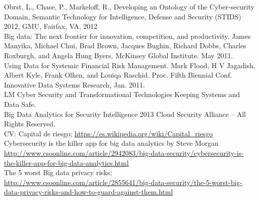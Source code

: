 \documentclass[journal]{IEEEtran}
\begin{document}
\begin{thebibliography}{1}

 Obrst, L., Chase, P., Markeloff, R., Developing an Ontology of the Cyber-security Domain, Semantic Technology for Intelligence, Defense and Security (STIDS) 2012, GMU, Fairfax, VA, 2012\\
 Big data: The next frontier for innovation, competition, and productivity. James Manyika, Michael Chui, Brad Brown, Jacques Bughin, Richard Dobbs, Charles Roxburgh, and Angela Hung Byers. McKinsey Global Institute. May 2011.\\
 Using Data for Systemic Financial Risk Management. Mark Flood, H V Jagadish, Albert Kyle, Frank Olken, and Louiqa Raschid. Proc. Fifth Biennial Conf. Innovative Data Systems Research, Jan. 2011.\\
 LM Cyber Security and Transformational Technologies Keeping Systems and Data Safe.\\
 Big Data Analytics for Security Intelligence 2013 Cloud Security Alliance – All Rights Reserved.\\
 CV: Capital de riesgo; \url{https://es.wikipedia.org/wiki/Capital_riesgo}\\
 Cybersecurity is the killer app for big data analytics by Steve Morgan \url{http://www.csoonline.com/article/2942083/big-data-security/cybersecurity-is-the-killer-app-for-big-data-analytics.html}\\
 The 5 worst Big data privacy risks; \url{http://www.csoonline.com/article/2855641/big-data-security/the-5-worst-big-data-privacy-risks-and-how-to-guard-against-them.html} \\

\end{thebibliography}
\end{document}
